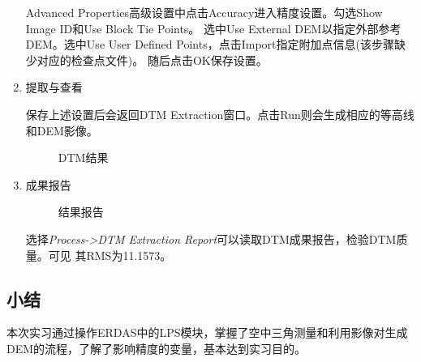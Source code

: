 \begin{enumerate}
        \hspace{20pt}Advanced Properties高级设置中点击Accuracy进入精度设置。勾选Show Image ID和Use Block Tie Points。
        选中Use External DEM以指定外部参考DEM。选中Use User Defined Points，点击Import指定附加点信息(该步骤缺少对应的检查点文件)。
        随后点击OK保存设置。

        \item 提取与查看


        \hspace{20pt}保存上述设置后会返回DTM Extraction窗口。点击Run则会生成相应的等高线和DEM影像。

        \begin{figure}[H]
            \centering
            \caption{DTM结果}
        \end{figure}

        \item 成果报告

        \begin{figure}[H]
            \centering
            \caption{结果报告}
        \end{figure}

        选择\textit{Process->DTM Extraction Report}可以读取DTM成果报告，检验DTM质量。可见
        其RMS为11.1573。

    \end{enumerate}
\subsection{小结}
    本次实习通过操作ERDAS中的LPS模块，掌握了空中三角测量和利用影像对生成DEM的流程，了解了影响精度的变量，基本达到实习目的。
